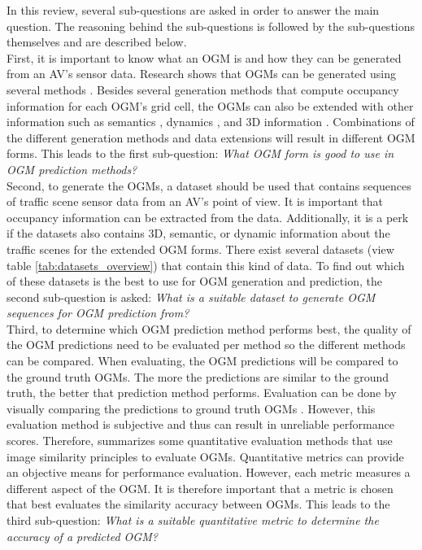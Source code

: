 In this review, several sub-questions are asked in order to answer the main question. The reasoning behind the sub-questions is followed by the sub-questions themselves and are described below. \\ 


First, it is important to know what an \gls{OGM} is and how they can be generated from an \gls{AV}'s sensor data. Research shows that \glspl{OGM} can be generated using several methods \cite{collins2007occupancy} \cite{ribo2001comparison} \cite{thrun2003learning}. Besides several generation methods that compute occupancy information for each \gls{OGM}'s grid cell, the \glspl{OGM} can also be extended with other information such as semantics \cite{lu2019monocular}, dynamics \cite{nuss2018random}, and 3D information \cite{degerman20163d}. Combinations of the different generation methods and data extensions will result in different \gls{OGM} forms. This leads to the first sub-question: \textit{What \gls{OGM} form is good to use in \gls{OGM} prediction methods?} \\

Second, to generate the \glspl{OGM}, a dataset should be used that contains sequences of traffic scene sensor data from an \gls{AV}'s point of view. It is important that occupancy information can be extracted from the data. Additionally, it is a perk if the datasets also contains 3D, semantic, or dynamic information about the traffic scenes for the extended \gls{OGM} forms. There exist several datasets (view table \ref{tab:datasets_overview}) that contain this kind of data. To find out which of these datasets is the best to use for \gls{OGM} generation and prediction, the second sub-question is asked: \textit{What is a suitable dataset to generate \gls{OGM} sequences for \gls{OGM} prediction from?} \\

Third, to determine which \gls{OGM} prediction method performs best, the quality of the \gls{OGM} predictions need to be evaluated per method so the different methods can be compared. When evaluating, the \gls{OGM} predictions will be compared to the ground truth \glspl{OGM}. The more the predictions are similar to the ground truth, the better that prediction method performs. Evaluation can be done by visually comparing the predictions to ground truth \glspl{OGM} \cite{ribo2001comparison}. However, this evaluation method is subjective and thus can result in unreliable performance scores. Therefore, \cite{collins2007occupancy} summarizes some quantitative evaluation methods that use image similarity principles to evaluate \glspl{OGM}. Quantitative metrics can provide an objective means for performance evaluation. However, each metric measures a different aspect of the \gls{OGM}. It is therefore important that a metric is chosen that best evaluates the similarity accuracy between \glspl{OGM}. This leads to the third sub-question: \textit{What is a suitable quantitative metric to determine the accuracy of a predicted \gls{OGM}?} \\

